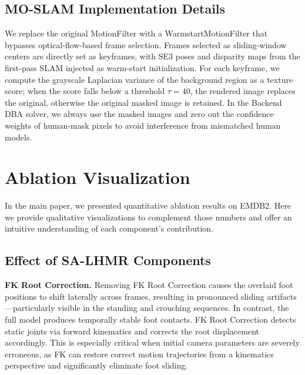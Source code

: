 \documentclass[runningheads]{llncs}
\begin{document}
\subsection{MO-SLAM Implementation Details}
\label{sec:suppl-moslam-impl}

We replace the original MotionFilter with a WarmstartMotionFilter that bypasses optical-flow-based frame selection. Frames selected as sliding-window centers are directly set as keyframes, with SE3 poses and disparity maps from the first-pass SLAM injected as warm-start initialization. For each keyframe, we compute the grayscale Laplacian variance of the background region as a texture score; when the score falls below a threshold $\tau = 40$, the rendered image replaces the original, otherwise the original masked image is retained. In the Backend DBA solver, we always use the masked images and zero out the confidence weights of human-mask pixels to avoid interference from mismatched human models.



\section{Ablation Visualization}
\label{sec:suppl-ablation-vis}

In the main paper, we presented quantitative ablation results on EMDB2. Here we provide qualitative visualizations to complement those numbers and offer an intuitive understanding of each component's contribution.

\subsection{Effect of SA-LHMR Components}

\noindent\textbf{FK Root Correction.}
Removing FK Root Correction causes the overlaid foot positions to shift laterally across frames, resulting in pronounced sliding artifacts---particularly visible in the standing and crouching sequences. In contrast, the full model produces temporally stable foot contacts. FK Root Correction detects static joints via forward kinematics and corrects the root displacement accordingly. This is especially critical when initial camera parameters are severely erroneous, as FK can restore correct motion trajectories from a kinematics perspective and significantly eliminate foot sliding.
\end{document}
